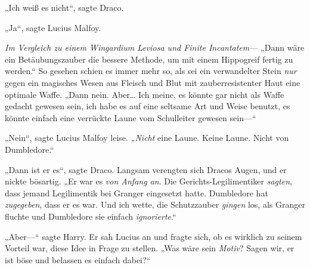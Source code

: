 „Ich weiß es nicht“, sagte Draco.

„Ja“, sagte Lucius Malfoy.

\emph{Im Vergleich zu einem Wingardium Leviosa und Finite Incantatem—}
„Dann wäre ein Betäubungszauber die bessere Methode, um mit einem Hippogreif fertig zu werden.“
So gesehen schien es immer mehr so, als sei ein verwandelter Stein \emph{nur} gegen ein magisches Wesen aus Fleisch und Blut mit zauberresistenter Haut eine optimale Waffe.
„Dann nein. Aber… Ich meine, es könnte gar nicht als Waffe gedacht gewesen sein, ich habe es auf eine seltsame Art und Weise benutzt, es könnte einfach eine verrückte Laune vom Schulleiter gewesen sein—“

„Nein“, sagte Lucius Malfoy leise. \emph{„Nicht} eine Laune. Keine Laune. Nicht von Dumbledore.“

„Dann ist er es“, sagte Draco.
Langsam verengten sich Dracos Augen, und er nickte bösartig.
„Er war es \emph{von Anfang an}. Die Gerichts-Legilimentiker \emph{sagten}, dass jemand Legilimentik bei Granger eingesetzt hatte. Dumbledore hat \emph{zugegeben}, dass er es war. Und ich wette, die Schutzzauber \emph{gingen} los, als Granger fluchte und Dumbledore sie einfach \emph{ignorierte}.“

„Aber—“ sagte Harry. Er sah Lucius an und fragte sich, ob es wirklich zu seinem Vorteil war, diese Idee in Frage zu stellen. „Was wäre sein \emph{Motiv}? Sagen wir, er ist böse und belassen es einfach dabei?“

